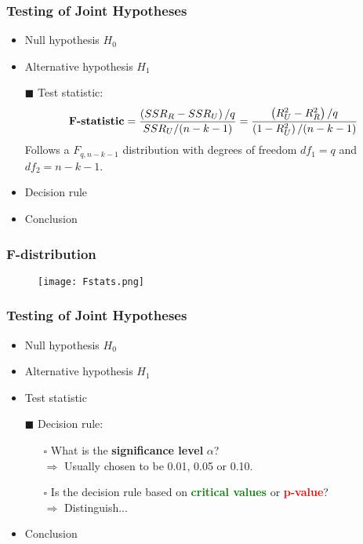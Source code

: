 \documentclass[11pt, xcolor=x11names,compress]{beamer}
\begin{document}
\begin{frame}[fragile,t]
\linespread{1.15}
\frametitle{Testing of Joint Hypotheses}
\begin{itemize}
    \item Null hypothesis $H_0$
    \item Alternative hypothesis $H_1$
    \item [$\blacksquare$] Test statistic:
    $$
    \textbf{\text{F-statistic}} =\frac{\left(S S R_{R}-S S R_{U}\right) / q}{S S R_{U} /(n-k-1)}  =\frac{\left(R_{U}^{2}-R_{R}^{2}\right) / q}{\left(1-R_{U}^{2}\right) /(n-k-1)}
    $$
    Follows a $F_{q,n-k-1}$ distribution with degrees of freedom $df_1 = q$ and $df_2 = n - k - 1$. 
    \item Decision rule
    \item Conclusion
\end{itemize}

\end{frame}

\begin{frame}[fragile,t]
\linespread{1.15}
\frametitle{F-distribution}
\begin{figure}
    \centering
    \texttt{[image: Fstats.png]}
    \caption{}
    \label{fig:my_label}
\end{figure}
\end{frame}

\begin{frame}[fragile,t]
\linespread{1.15}
\frametitle{Testing of Joint Hypotheses}
\begin{itemize}
    \item Null hypothesis $H_0$
    \item Alternative hypothesis $H_1$
    \item Test statistic
    \item [$\blacksquare$] Decision rule:
    \begin{itemize}
        \item [$\square$] What is the \textbf{significance level} $\alpha$?\\
        $\Longrightarrow$ Usually chosen to be 0.01, 0.05 or 0.10.
        \item [$\square$] Is the decision rule based on \textcolor{green}{\textbf{critical values}} or \textcolor{red}{\textbf{p-value}}?\\
        $\Longrightarrow$ Distinguish...
    \end{itemize}
    \item Conclusion
\end{itemize}

\end{frame}
\end{document}

